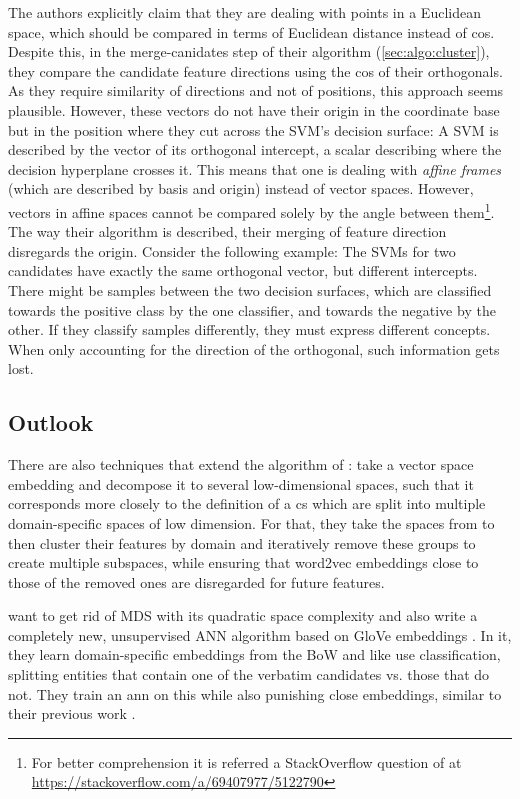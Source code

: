The authors explicitly claim that they are dealing with points in a Euclidean space, which should be compared in terms of Euclidean distance \cite[14]{Derrac2015} instead of \gls{cos}. Despite this, in the merge-canidates step of their algorithm (\autoref{sec:algo:cluster}), they compare the candidate feature directions using the \gls{cos} of their orthogonals. As they require similarity of directions and not of positions, this approach seems plausible. However, these vectors do not have their origin in the coordinate base but in the position where they cut across the SVM's decision surface: A SVM is described by the vector of its orthogonal intercept, a scalar describing where the decision hyperplane crosses it. This means that one is dealing with \textit{affine frames} (which are described by basis and origin) instead of vector spaces. However, vectors in affine spaces cannot be compared solely by the angle between them\footnote{For better comprehension it is referred a StackOverflow question of \me at \url{https://stackoverflow.com/a/69407977/5122790}}. The way their algorithm is described, their merging of feature direction disregards the origin. Consider the following example: The SVMs for two candidates have exactly the same orthogonal vector, but different intercepts. There might be samples between the two decision surfaces, which are classified towards the positive class by the one classifier, and towards the negative by the other. If they classify samples differently, they must express different concepts. When only accounting for the direction of the orthogonal, such information gets lost. 

\subsection{Outlook}

There are also techniques that extend the algorithm of \textcite{Derrac2015}: \textcite{Alshaikh2019} take a vector space embedding and decompose it to several low-dimensional spaces, such that it corresponds more closely to the definition of a \gls{cs} which are split into multiple domain-specific spaces of low dimension. For that, they take the spaces from \cite{Derrac2015} to then cluster their features by domain and iteratively remove these groups to create multiple subspaces, while ensuring that \gls{word2vec} embeddings close to those of the removed ones are disregarded for future features.

\textcite{Alshaikh2021} want to get rid of MDS with its quadratic space complexity and also write a completely new, unsupervised ANN algorithm based on GloVe embeddings \cite{pennington2014glove}. In it, they learn domain-specific embeddings from the BoW and like \cite{Derrac2015} use classification, splitting entities that contain one of the verbatim candidates vs. those that do not. They train an \gls{ann} on this while also punishing close embeddings, similar to their previous work \cite{Alshaikh2019}.


